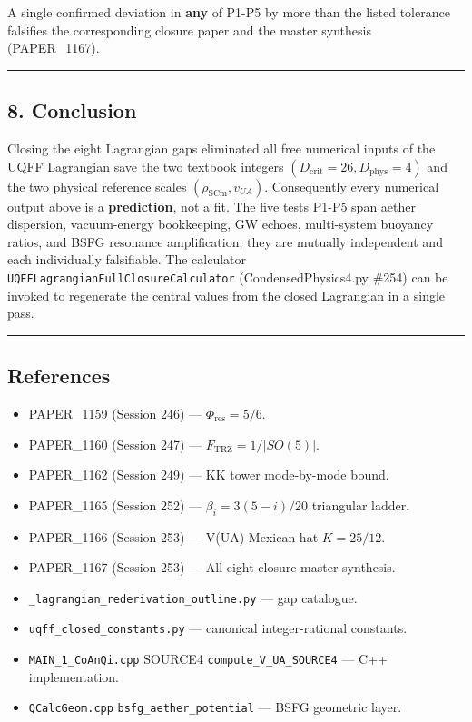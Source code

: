 \documentclass[
]{article}
\providecommand{\tightlist}{%
  \setlength{\itemsep}{0pt}\setlength{\parskip}{0pt}}
\begin{document}
A single confirmed deviation in \textbf{any} of P1-P5 by more than the
listed tolerance falsifies the corresponding closure paper and the
master synthesis (PAPER\_1167).

\begin{center}\rule{0.5\linewidth}{0.5pt}\end{center}

\subsection{8. Conclusion}\label{conclusion}

Closing the eight Lagrangian gaps eliminated all free numerical inputs
of the UQFF Lagrangian save the two textbook integers
\((D_{\mathrm{crit}}=26, D_{\mathrm{phys}}=4)\) and the two physical
reference scales \((\rho_{\mathrm{SCm}}, v_{UA})\). Consequently every
numerical output above is a \textbf{prediction}, not a fit. The five
tests P1-P5 span aether dispersion, vacuum-energy bookkeeping, GW
echoes, multi-system buoyancy ratios, and BSFG resonance amplification;
they are mutually independent and each individually falsifiable. The
calculator \texttt{UQFFLagrangianFullClosureCalculator}
(CondensedPhysics4.py \#254) can be invoked to regenerate the central
values from the closed Lagrangian in a single pass.

\begin{center}\rule{0.5\linewidth}{0.5pt}\end{center}

\subsection{References}\label{references}

\begin{itemize}
\tightlist
\item
  PAPER\_1159 (Session 246) --- \(\Phi_{\text{res}} = 5/6\).
\item
  PAPER\_1160 (Session 247) --- \(F_{\text{TRZ}} = 1/|SO(5)|\).
\item
  PAPER\_1162 (Session 249) --- KK tower mode-by-mode bound.
\item
  PAPER\_1165 (Session 252) --- \(\beta_{i} = 3(5-i)/20\) triangular
  ladder.
\item
  PAPER\_1166 (Session 253) --- V(UA) Mexican-hat \(K = 25/12\).
\item
  PAPER\_1167 (Session 253) --- All-eight closure master synthesis.
\item
  \texttt{\_lagrangian\_rederivation\_outline.py} --- gap catalogue.
\item
  \texttt{uqff\_closed\_constants.py} --- canonical integer-rational
  constants.
\item
  \texttt{MAIN\_1\_CoAnQi.cpp} SOURCE4 \texttt{compute\_V\_UA\_SOURCE4}
  --- C++ implementation.
\item
  \texttt{QCalcGeom.cpp} \texttt{bsfg\_aether\_potential} --- BSFG
  geometric layer.
\end{itemize}




\end{document}
